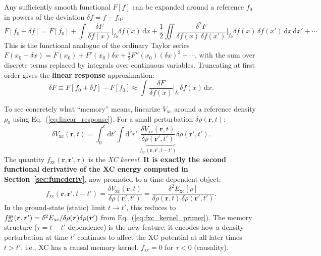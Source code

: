 \documentclass[12pt,letterpaper]{article}
\newcommand{\dd}{\mathrm{d}}
\newcommand{\Vxc}{V_{\mathrm{xc}}}
\newcommand{\fxc}{f_{\mathrm{xc}}}
\newcommand{\Exc}{E_{\mathrm{xc}}}
\theoremstyle{definition}
\begin{document}
\begin{keyresult}[title={Functional Taylor Expansion}]
Any sufficiently smooth functional $F[f]$ can be expanded around a
reference $f_0$ in powers of the deviation $\delta f = f - f_0$:
\begin{equation}
  F[f_0 + \delta f]
  = F[f_0]
    + \int \frac{\delta F}{\delta f(x)}\bigg|_{f_0}\!\!\delta f(x)\,\dd x
    + \frac{1}{2}\iint
        \frac{\delta^2 F}{\delta f(x)\,\delta f(x')}\bigg|_{f_0}\!\!
        \delta f(x)\,\delta f(x')\,\dd x\,\dd x'
    + \cdots
  \label{eq:func_taylor}
\end{equation}
This is the functional analogue of the ordinary Taylor series
$F(x_0+\delta x) = F(x_0) + F'(x_0)\delta x + \tfrac{1}{2}F''(x_0)(\delta x)^2 + \cdots$,
with the sum over discrete terms replaced by integrals over continuous variables.
Truncating at first order gives the \textbf{linear response} approximation:
\begin{equation}
  \delta F \equiv F[f_0+\delta f] - F[f_0]
  \approx \int \frac{\delta F}{\delta f(x)}\bigg|_{f_0}\!\!\delta f(x)\,\dd x.
  \label{eq:linear_response}
\end{equation}
\end{keyresult}

To see concretely what ``memory'' means, linearize $\Vxc$ around a
reference density $\rho_0$ using Eq.~(\ref{eq:linear_response}). For a small perturbation
$\delta\rho(\bm{r},t)$:
\begin{equation}
  \delta\Vxc(\bm{r},t)
  = \int_0^t\!\dd t'\!\int\!\dd^3r'\;
    \underbrace{\frac{\delta\Vxc(\bm{r},t)}{\delta\rho(\bm{r}',t')}}_{\displaystyle\fxc(\bm{r},\bm{r}',t-t')}
    \delta\rho(\bm{r}',t').
  \label{eq:fxc_def}
\end{equation}
The quantity $\fxc(\bm{r},\bm{r}',\tau)$ is the \emph{XC kernel}.
\textbf{It is exactly the second functional derivative of the XC energy
computed in Section~\ref{sec:funcderiv}}, now promoted to a time-dependent
object:
\begin{equation}
  \fxc(\bm{r},\bm{r}',t-t')
  = \frac{\delta\Vxc(\bm{r},t)}{\delta\rho(\bm{r}',t')}
  = \frac{\delta^2\Exc[\rho]}{\delta\rho(\bm{r},t)\,\delta\rho(\bm{r}',t')}.
  \label{eq:fxc_is_sfd}
\end{equation}
In the ground-state (static) limit $t\to t'$, this reduces to
$\fxc^{\rm gs}(\bm{r},\bm{r}') = \delta^2\Exc/\delta\rho(\bm{r})\delta\rho(\bm{r}')$
from Eq.~(\ref{eq:fxc_kernel_primer}).
The memory structure ($\tau = t-t'$ dependence) is the new feature:
it encodes how a density perturbation at time $t'$ continues to affect
the XC potential at all later times $t > t'$, i.e., XC has a causal
memory kernel. $\fxc = 0$ for $\tau < 0$ (causality).
\end{document}
